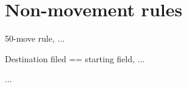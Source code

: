 \section*{Non-movement rules}
\label{sec:Remarks/Non-movement rules}

50-move rule, ...

Destination filed == starting field, ...

...

\clearpage %
